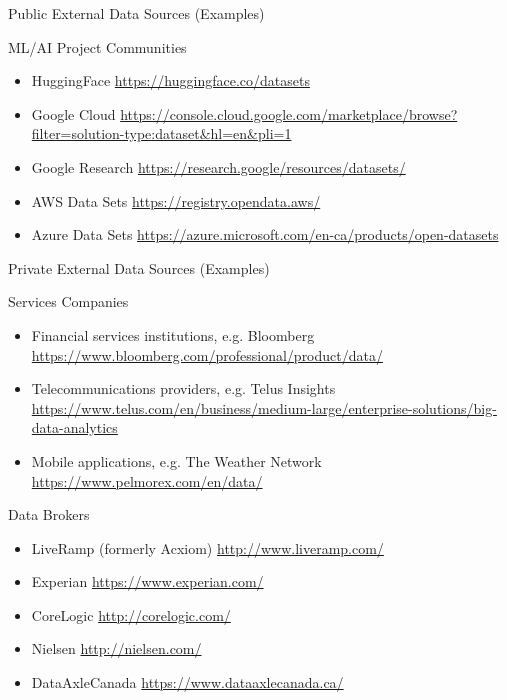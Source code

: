 \documentclass[ignorenonframetext,xcolor=x11names]{beamer}
\begin{document}
\begin{frame}[allowframebreaks]{Public External Data Sources (Examples)}
\begin{block}{ML/AI Project Communities}
\begin{itemize}
	\item HuggingFace \url{https://huggingface.co/datasets}
	\item Google Cloud \url{https://console.cloud.google.com/marketplace/browse?filter=solution-type:dataset&hl=en&pli=1}
	\item Google Research \url{https://research.google/resources/datasets/}
	\item AWS Data Sets \url{https://registry.opendata.aws/}
	\item Azure Data Sets \url{https://azure.microsoft.com/en-ca/products/open-datasets}
\end{itemize}
\end{block}
\end{frame}

\begin{frame}{Private External Data Sources (Examples)}
\small
\begin{block}{Services Companies}
\begin{itemize}
	\item Financial services institutions, e.g. Bloomberg {\footnotesize \url{https://www.bloomberg.com/professional/product/data/}}
	\item Telecommunications providers, e.g. Telus Insights {\footnotesize \url{https://www.telus.com/en/business/medium-large/enterprise-solutions/big-data-analytics}}
	\item Mobile applications, e.g. The Weather Network {\footnotesize \url{https://www.pelmorex.com/en/data/}}
\end{itemize}
\end{block}

\begin{block}{Data Brokers}
\begin{itemize}
	\item LiveRamp (formerly Acxiom) {\footnotesize \url{http://www.liveramp.com/}}
	\item Experian {\footnotesize \url{https://www.experian.com/}}
	\item CoreLogic {\footnotesize \url{http://corelogic.com/}}
	\item Nielsen {\footnotesize \url{http://nielsen.com/}}
	\item DataAxleCanada {\footnotesize \url{https://www.dataaxlecanada.ca/}}
\end{itemize}
\end{block}
\end{frame}
\end{document}
